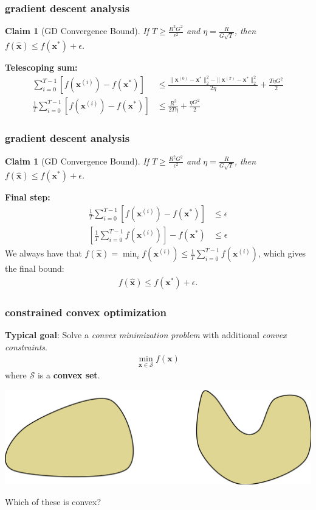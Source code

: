 \documentclass[compress]{beamer}
\newcommand{\bv}[1]{\mathbf{#1}}
\newtheorem{claim}[theorem]{Claim}
\begin{document}
\begin{frame}[t]
	\frametitle{gradient descent analysis}
	\small
	\begin{claim}[GD Convergence Bound]
	If $T \geq \frac{R^2G^2}{\epsilon^2}$ and $\eta = \frac{R}{G\sqrt{T}}$, then $f(\hat{\bv{x}}) \leq f(\bv{x}^*) + \epsilon$.
	\end{claim}
\textbf{Telescoping sum:}
\begin{align*}
	\sum_{i=0}^{T-1}\left[f(\bv{x}^{(i)}) - f(\bv{x}^*)\right] &\leq \frac{\|\bv{x}^{(0)} - \bv{x}^*\|_2^2 - \|\bv{x}^{(T)} - \bv{x}^*\|_2^2}{2\eta} + \frac{T\eta G^2}{2}\\
	\frac{1}{T}\sum_{i=0}^{T-1}\left[f(\bv{x}^{(i)}) - f(\bv{x}^*)\right] &\leq \frac{R^2}{2T\eta} + \frac{\eta G^2}{2}
\end{align*}
\end{frame}
\begin{frame}[t]
	\frametitle{gradient descent analysis}
	\begin{claim}[GD Convergence Bound]
		If $T \geq \frac{R^2G^2}{\epsilon^2}$ and $\eta = \frac{R}{G\sqrt{T}}$, then $f(\hat{\bv{x}}) \leq f(\bv{x}^*) + \epsilon$.
	\end{claim}
	\textbf{Final step:}
	\begin{align*}
		\frac{1}{T}\sum_{i=0}^{T-1}\left[f(\bv{x}^{(i)}) - f(\bv{x}^*)\right] &\leq \epsilon \\ 
		\left[\frac{1}{T}\sum_{i=0}^{T-1}f(\bv{x}^{(i)})\right] - f(\bv{x}^*) &\leq \epsilon 
	\end{align*}
We always have that $f(\hat{\bv{x}}) = \min_i f(\bv{x}^{(i)}) \leq \frac{1}{T}\sum_{i=0}^{T-1}f(\bv{x}^{(i)})$, which gives the final bound:
\begin{align*}
	f(\hat{\bv{x}}) \leq f(\bv{x}^*) + \epsilon. 
\end{align*}
\end{frame}

\begin{frame}[t]
	\frametitle{constrained convex optimization}
	\textbf{Typical goal}: Solve a \emph{convex minimization problem} with additional \emph{convex constraints}.  
	\begin{align*}
		\min_{\bv{x}\in \mathcal{S}} f(\bv{x})
	\end{align*}
where $\mathcal{S}$ is a \textbf{\alert{convex set}}. 
\begin{center}
	\includegraphics[width=.7\textwidth]{sets.png}
	
	Which of these is convex?
\end{center}
\end{frame}
\end{document}
